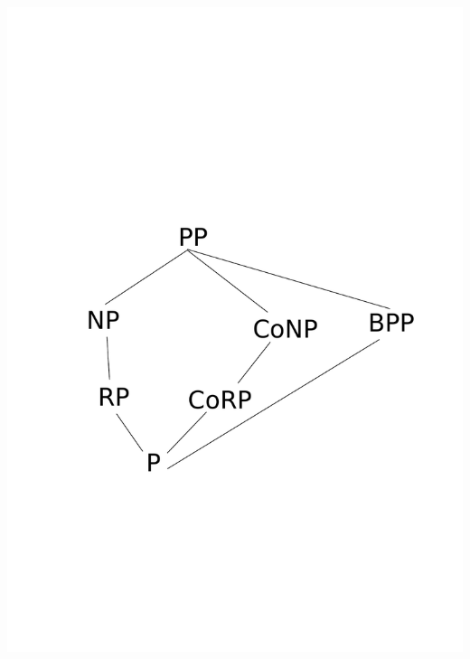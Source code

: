 \begin{center}
\includegraphics[scale=0.3, trim = 30mm 50mm 0mm 5mm, clip]{Lecture11-Princy/hie2}

\end{center}
